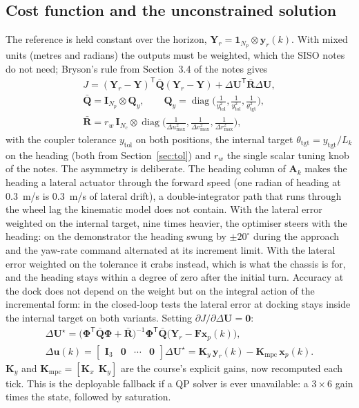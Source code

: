 \documentclass[11pt,a4paper]{article}
\newcommand{\vect}[1]{\bm{#1}}
\newcommand{\mat}[1]{\bm{#1}}
\newcommand{\T}{^{\mathsf{T}}}
\newcommand{\diag}{\operatorname{diag}}
\newcommand{\dU}{\Delta\vect{U}}
\newcommand{\du}{\Delta\vect{u}}
\newcommand{\Np}{N_p}
\newcommand{\Nc}{N_c}
\newcommand{\Qbar}{\bar{\mat{Q}}}
\newcommand{\Rbar}{\bar{\mat{R}}}
\newcommand{\ones}{\vect{1}}
\begin{document}
\subsection{Cost function and the unconstrained solution}
\label{sec:cost}
The reference is held constant over the horizon, $\vect Y_r = \ones_{\Np}\otimes\vect y_r(k)$. With mixed units (metres and radians) the outputs must be weighted, which the SISO notes do not need; Bryson's rule from Section~3.4 of the notes gives
\begin{gather}
J = (\vect Y_r-\vect Y)\T\Qbar(\vect Y_r-\vect Y) + \dU\T\Rbar\dU,
\label{eq:J}\\
\Qbar = \mat I_{\Np}\otimes\mat Q_y,\qquad
\mat Q_y = \diag\!\Big(\tfrac{1}{y_{\mathrm{tol}}^2},\tfrac{1}{y_{\mathrm{tol}}^2},\tfrac{1}{\theta_{\mathrm{tgt}}^2}\Big),\\
\Rbar = r_w\,\mat I_{\Nc}\otimes\diag\!\Big(\tfrac{1}{\Delta u_{\max}^2},\tfrac{1}{\Delta v_{\max}^2},\tfrac{1}{\Delta r_{\max}^2}\Big),
\end{gather}
with the coupler tolerance $y_{\mathrm{tol}}$ on both positions, the internal target $\theta_{\mathrm{tgt}}=y_{\mathrm{tgt}}/L_k$ on the heading (both from Section~\ref{sec:tol}) and $r_w$ the single scalar tuning knob of the notes. The asymmetry is deliberate. The heading column of $\mat A_k$ makes the heading a lateral actuator through the forward speed (one radian of heading at $0.3$~m/s is $0.3$~m/s of lateral drift), a double-integrator path that runs through the wheel lag the kinematic model does not contain. With the lateral error weighted on the internal target, nine times heavier, the optimiser steers with the heading: on the demonstrator the heading swung by $\pm 20^\circ$ during the approach and the yaw-rate command alternated at its increment limit. With the lateral error weighted on the tolerance it crabs instead, which is what the chassis is for, and the heading stays within a degree of zero after the initial turn. Accuracy at the dock does not depend on the weight but on the integral action of the incremental form: in the closed-loop tests the lateral error at docking stays inside the internal target on both variants. Setting $\partial J/\partial\dU=\vect 0$:
\begin{gather}
\dU^\star = \big(\mat\Phi\T\Qbar\mat\Phi+\Rbar\big)^{-1}\mat\Phi\T\Qbar\big(\vect Y_r-\mat F\vect x_p(k)\big),
\label{eq:unc}\\
\du(k) = \begin{bmatrix}\mat I_3 & \mat 0 & \cdots & \mat 0\end{bmatrix}\dU^\star
= \mat K_y\,\vect y_r(k) - \mat K_{\mathrm{mpc}}\,\vect x_p(k).
\end{gather}
$\mat K_y$ and $\mat K_{\mathrm{mpc}}=[\mat K_x\ \ \mat K_y]$ are the course's explicit gains, now recomputed each tick. This is the deployable fallback if a QP solver is ever unavailable: a $3\times 6$ gain times the state, followed by saturation.
\end{document}
